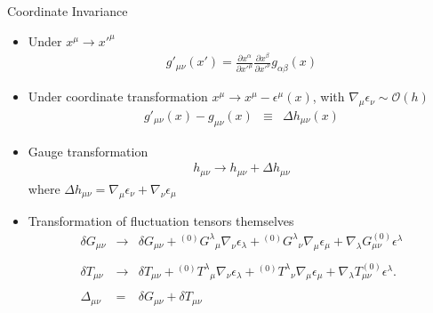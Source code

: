 \documentclass[8pt,aspectratio=1610]{beamer}
\begin{document}
\begin{frame}{Coordinate Invariance}
	\begin{itemize}
		\item Under $x^\mu \to x'^\mu$
		\begin{eqnarray}
			g'_{\mu\nu}(x') = \frac{\partial x^\alpha}{\partial x'^\mu}\frac{\partial x^\beta}{\partial x'^\nu}g_{\alpha\beta}(x)
		\end{eqnarray}
		\item 	Under coordinate transformation $x^\mu \to x^\mu - \epsilon^\mu(x)$, with $\nabla_\mu \epsilon_\nu \sim \mathcal O(h)$
			\begin{eqnarray}
				g'_{\mu\nu}(x) - g_{\mu\nu}(x) &\equiv& \Delta h_{\mu\nu}(x)
			\end{eqnarray}
		\item Gauge transformation 
				\begin{eqnarray}
				h_{\mu\nu} \to h_{\mu\nu} + \Delta h_{\mu\nu} 
				\end{eqnarray}
				where $\Delta h_{\mu\nu} = \nabla_\mu \epsilon_\nu + \nabla_\nu \epsilon_\mu$
		\item Transformation of fluctuation tensors themselves
				\begin{eqnarray}
				\delta G_{\mu\nu} &\to& \delta G_{\mu\nu} + {}^{(0)}G^\lambda{}_\mu \nabla_\nu \epsilon_\lambda +  {}^{(0)}G^{\lambda}{}_{\nu}\nabla_\mu \epsilon_\mu + \nabla_\lambda  G^{(0)}_{\mu\nu} \epsilon^\lambda
				\\ \nonumber\\
				\delta T_{\mu\nu} &\to& \delta T_{\mu\nu} + {}^{(0)}T^\lambda{}_\mu \nabla_\nu \epsilon_\lambda +  {}^{(0)}T^{\lambda}{}_{\nu}\nabla_\mu \epsilon_\mu + \nabla_\lambda  T^{(0)}_{\mu\nu} \epsilon^\lambda.
				\\ \nonumber\\
				\Delta_{\mu\nu} &=& \delta G_{\mu\nu} + \delta T_{\mu\nu}
			\end{eqnarray}
	\end{itemize}


\end{frame}
\end{document}

